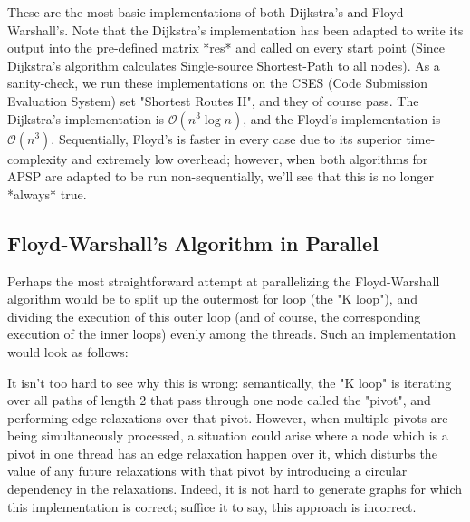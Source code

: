 \documentclass[conference]{IEEEtran}
\begin{document}
These are the most basic implementations of both Dijkstra's and Floyd-Warshall's. Note that the Dijkstra's implementation has been adapted to write its output into the pre-defined matrix *res* and called on every start point (Since Dijkstra's algorithm calculates Single-source Shortest-Path to all nodes). As a sanity-check, we run these implementations on the CSES (Code Submission Evaluation System) set "Shortest Routes II", and they of course pass. The Dijkstra's implementation is $\mathcal{O}(n^3\log{}n)$, and the Floyd's implementation is $\mathcal{O}(n^3)$. Sequentially, Floyd's is faster in every case due to its superior time-complexity and extremely low overhead; however, when both algorithms for APSP are adapted to be run non-sequentially, we'll see that this is no longer *always* true. 

\subsection{Floyd-Warshall's Algorithm in Parallel}
Perhaps the most straightforward attempt at parallelizing the Floyd-Warshall algorithm would be to split up the outermost for loop (the "K loop"), and dividing the execution of this outer loop (and of course, the corresponding execution of the inner loops) evenly among the threads. Such an implementation would look as follows:



It isn't too hard to see why this is wrong: semantically, the "K loop" is iterating over all paths of length 2 that pass through one node called the "pivot", and performing edge relaxations over that pivot. However, when multiple pivots are being simultaneously processed, a situation could arise where a node which is a pivot in one thread has an edge relaxation happen over it, which disturbs the value of any future relaxations with that pivot by introducing a circular dependency in the relaxations. Indeed, it is not hard to generate graphs for which this implementation is correct; suffice it to say, this approach is incorrect.
\end{document}
